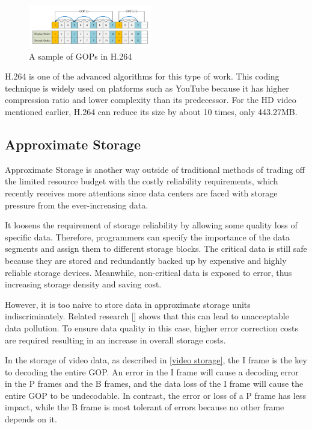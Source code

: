 \documentclass[conference]{IEEEtran}
\begin{document}
\begin{figure}[ht]
\centering
\includegraphics[width=0.48\textwidth]{photo/H264_IPB.pdf}
\caption{A sample of GOPs in H.264}
\label{H264-IPB}
\end{figure}

H.264 is one of the advanced algorithms for this type of work. This coding technique is widely used on platforms such as YouTube because it has higher compression ratio and lower complexity than its predecessor. For the HD video mentioned earlier, H.264 can reduce its size by about 10 times, only 443.27MB.

\subsection{Approximate Storage}
Approximate Storage is another way outside of traditional methods of trading off the limited resource budget with the costly reliability requirements, which recently receives more attentions since data centers are faced with storage pressure from the ever-increasing data.

It loosens the requirement of storage reliability by allowing some quality loss of specific data. Therefore, programmers can specify the importance of the data segments and assign them to different storage blocks. The critical data is still safe because they are stored and redundantly backed up by expensive and highly reliable storage devices. Meanwhile, non-critical data is exposed to error, thus increasing storage density and saving cost.

However, it is too naive to store data in approximate storage units indiscriminately. Related research [] shows that this can lead to unacceptable data pollution. To ensure data quality in this case, higher error correction costs are required resulting in an increase in overall storage costs.

In the storage of video data, as described in \ref{video storage}, the I frame is the key to decoding the entire GOP. An error in the I frame will cause a decoding error in the P frames and the B frames, and the data loss of the I frame will cause the entire GOP to be undecodable. In contrast, the error or loss of a P frame has less impact, while the B frame is most tolerant of errors because no other frame depends on it.
\end{document}
